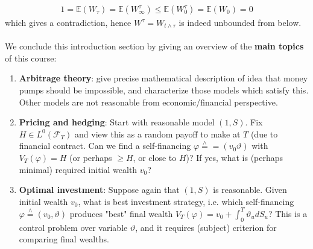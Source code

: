 \documentclass[12pt,a4paper, twoside]{article}
\theoremstyle{definition}
\newcommand{\EE}{\mathbb{E}} %
\newcommand{\teq}{\overset{\wedge}{=}}
\begin{document}
\begin{align*}
1=\EE(W_\tau)=\EE( W_\infty^\tau) \leq \EE( W_0^\tau) = \EE(W_0)=0
\end{align*}
which gives a contradiction, hence $W^\tau = W_{t \wedge \tau}$ is indeed unbounded from below. 
\\\\
We conclude this introduction section by giving an overview of the \textbf{main topics} of this course:
\begin{enumerate}
\item \textbf{Arbitrage theory}: give precise mathematical description of idea that money pumps should be impossible, and characterize those models which satisfy this. Other models are not reasonable from economic/financial perspective.
\item \textbf{Pricing and hedging}: Start with reasonable model $(1,S)$. Fix $H \in L^0( \mathcal{F}_T)$ and view this as a random payoff to make at $T$ (due to financial contract. Can we find a self-financing $\varphi \teq = (v_0 \vartheta)$ with $V_T( \varphi)=H$ (or perhaps $ \geq H$, or close to $H$)? If yes, what is (perhaps minimal) required initial wealth $v_0$?
\item \textbf{Optimal investment}: Suppose again that $(1,S)$ is reasonable. Given initial wealth $v_0$, what is best investment strategy, i.e. which self-financing $\varphi \teq (v_0, \vartheta)$ produces "best" final wealth $V_T( \varphi) = v_0 +  \int_0^T \vartheta_u dS_u$? This is a control problem over variable $\vartheta$, and it requires (subject) criterion for comparing final wealths. 
\end{enumerate}
\newpage
\end{document}
